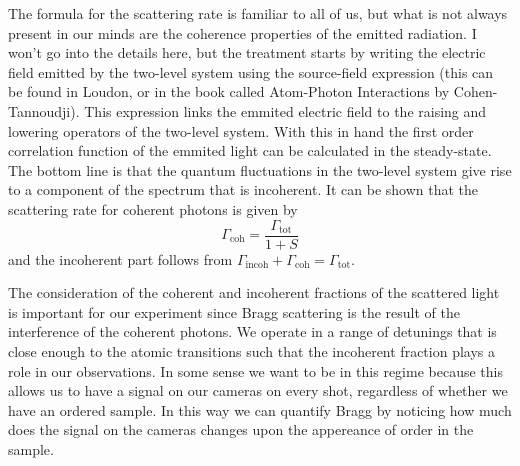 \documentclass[11pt,letter]{article}
\begin{document}
The formula for the scattering rate is familiar to all of us, but what is not
always present in our minds are the coherence properties of the emitted
radiation.    I won't go into the details here, but the treatment starts by
writing the electric field emitted by the two-level system using the
source-field expression (this can be found in Loudon, or in the book called
Atom-Photon Interactions by Cohen-Tannoudji).   This expression links the
emmited electric field to the raising and lowering operators of the two-level
system.  With this in hand the first order correlation function of the emmited
light can be calculated in the steady-state.   The bottom line is that the
quantum fluctuations in the two-level system give rise to a component of the
spectrum that is incoherent.  It can be shown that the scattering rate for
coherent photons is given by 
\begin{equation} 
\Gamma_{\mathrm{coh}} = \frac{\Gamma_{\mathrm{tot}}}{ 1+S }  
\end{equation}
and the incoherent part follows from $\Gamma_{\mathrm{incoh}} + \Gamma_{\mathrm{coh}} = \Gamma_{\mathrm{tot}}$.

The consideration of the coherent and incoherent fractions of the scattered
light is important for our experiment since Bragg scattering is the result of
the interference of the coherent photons.   We operate in a range of detunings
that is close enough to the atomic transitions such that the incoherent
fraction plays a role in our observations.  In some sense we want to be in this
regime because this allows us to have a signal on our cameras on every shot,
regardless of whether we have an ordered sample.  In this way we can quantify
Bragg by noticing how much does the signal on the cameras changes upon the
appereance of order in the sample. 
\end{document}
